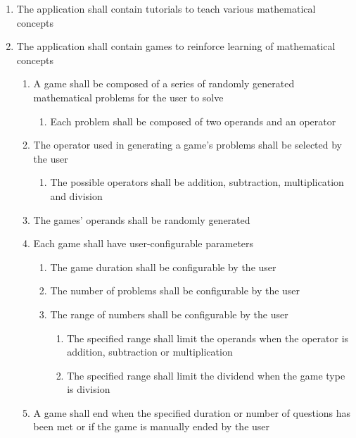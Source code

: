 \documentclass[12pt,letterpaper,oneside]{article}
\begin{document}
\begin{enumerate}
	\item
		The application shall contain tutorials to teach various mathematical concepts

	\item	%
		The application shall contain games to reinforce learning of mathematical concepts
		\begin{enumerate}
			\item	%
				A game shall be composed of a series of randomly generated mathematical problems for the user to solve
				\begin{enumerate}
					\item %
						Each problem shall be composed of two operands and an operator
				\end{enumerate}
			\item	%
				The operator used in generating a game's problems shall be selected by the user
				\begin{enumerate}
					\item %
						The possible operators shall be addition, subtraction, multiplication and division
				\end{enumerate}
			\item	%
				The games' operands shall be randomly generated
			\item	%
				Each game shall have user-configurable parameters
				\begin{enumerate}
					\item	%
						The game duration shall be configurable by the user
					\item	%
						The number of problems shall be configurable by the user
					\item	%
						The range of numbers shall be configurable by the user
						\begin{enumerate}
							\item %
								The specified range shall limit the operands when the operator is addition, subtraction or multiplication
							\item %
								The specified range shall limit the dividend when the game type is division
						\end{enumerate}
				\end{enumerate}
			\item	%
				A game shall end when the specified duration or number of questions has been met or if the game is manually ended by the user
		\end{enumerate}


\end{enumerate}
\end{document}

